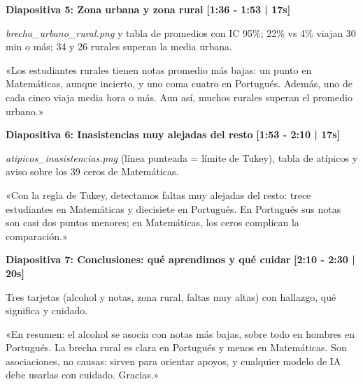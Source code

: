 \documentclass[11pt,a4paper]{article}
\begin{document}
\vspace{0.4cm}

\noindent
\textbf{\large Diapositiva 5: Zona urbana y zona rural} \hfill \textcolor{timeRed}{\textbf{[1:36 - 1:53 | 17s]}}
\begin{description}[noitemsep,topsep=2pt]
  \item[Visual en Pantalla:] \textit{brecha\_urbano\_rural.png} y tabla de promedios con IC 95\%; 22\% vs 4\% viajan 30 min o más; 34 y 26 rurales superan la media urbana.
  \item[Guion de Voz (Speech):]
    «Los estudiantes rurales tienen notas promedio más bajas: un punto en Matemáticas, aunque incierto, y uno coma cuatro en Portugués. Además, uno de cada cinco viaja media hora o más. Aun así, muchos rurales superan el promedio urbano.»
\end{description}

\vspace{0.4cm}

\noindent
\textbf{\large Diapositiva 6: Inasistencias muy alejadas del resto} \hfill \textcolor{timeRed}{\textbf{[1:53 - 2:10 | 17s]}}
\begin{description}[noitemsep,topsep=2pt]
  \item[Visual en Pantalla:] \textit{atipicos\_inasistencias.png} (línea punteada = límite de Tukey), tabla de atípicos y aviso sobre los 39 ceros de Matemáticas.
  \item[Guion de Voz (Speech):]
    «Con la regla de Tukey, detectamos faltas muy alejadas del resto: trece estudiantes en Matemáticas y diecisiete en Portugués. En Portugués sus notas son casi dos puntos menores; en Matemáticas, los ceros complican la comparación.»
\end{description}

\vspace{0.4cm}

\noindent
\textbf{\large Diapositiva 7: Conclusiones: qué aprendimos y qué cuidar} \hfill \textcolor{timeRed}{\textbf{[2:10 - 2:30 | 20s]}}
\begin{description}[noitemsep,topsep=2pt]
  \item[Visual en Pantalla:] Tres tarjetas (alcohol y notas, zona rural, faltas muy altas) con hallazgo, qué significa y cuidado.
  \item[Guion de Voz (Speech):]
    «En resumen: el alcohol se asocia con notas más bajas, sobre todo en hombres en Portugués. La brecha rural es clara en Portugués y menos en Matemáticas. Son asociaciones, no causas: sirven para orientar apoyos, y cualquier modelo de IA debe usarlas con cuidado. Gracias.»
\end{description}
\end{document}
